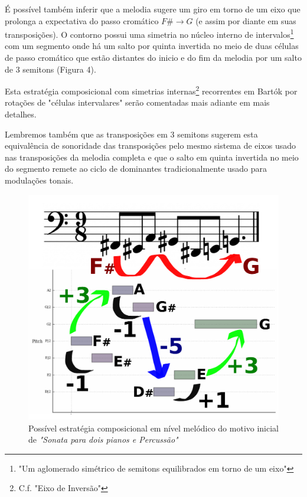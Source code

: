 \documentclass[
	12pt,				%
	openright,			%
	twoside,			%
	a4paper,			%
	english,			%
	french,				%
	spanish,			%
	brazil				%
	]{abntex2}
\begin{document}
É possível também inferir que a melodia sugere um giro em torno de um eixo que prolonga a expectativa do passo cromático $F\# \rightarrow G$ (e assim por diante em suas transposições). O contorno possui uma simetria no núcleo interno de intervalos\footnote{"Um aglomerado simétrico de semitons equilibrados em torno de um eixo"\cite[ p.120]{straus2004}} com um segmento onde há um salto por quinta invertida no meio de duas células de passo cromático que estão distantes do inicio e do fim da melodia por um salto de 3 semitons (Figura 4). 

Esta estratégia composicional com simetrias internas\footnote{C.f. "Eixo de Inversão"\cite[ p.121]{straus2004}} recorrentes em Bartók por rotações de "células intervalares"\cite[ p.128]{susanni_antokoletz2012music} serão comentadas mais adiante em mais detalhes. 

Lembremos também que as transposições em 3 semitons sugerem esta equivalência de sonoridade das transposições pelo mesmo sistema de eixos usado nas transposições da melodia completa e que o salto em quinta invertida no meio do segmento remete ao ciclo de dominantes tradicionalmente usado para modulações tonais.


\begin{figure}[!h]
	\caption{\label{fig_grafico}Possível estratégia composicional em nível melódico do motivo inicial de \textit{"Sonata para dois pianos e Percussão"}}
	\begin{center}
	    \includegraphics[scale=0.4]{axis/temasonata2P.pdf}
	\end{center}
\end{figure}
\end{document}
